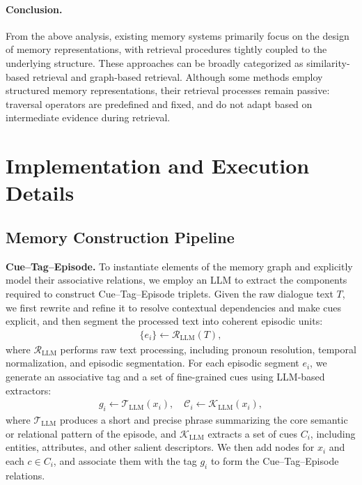 \documentclass{llmxive}
\begin{document}
\paragraph{Conclusion.}
From the above analysis, existing memory systems primarily focus on the design of
memory representations, with retrieval procedures tightly coupled to the
underlying structure.
These approaches can be broadly categorized as similarity-based retrieval and
graph-based retrieval.
Although some methods employ structured memory representations, their retrieval
processes remain passive: traversal operators are predefined and fixed, and do
not adapt based on intermediate evidence during retrieval.



\section{Implementation and Execution Details}
\subsection{Memory Construction Pipeline}
\label{app:memory_system}
\textbf{Cue--Tag--Episode.}
To instantiate elements of the memory graph and explicitly model their associative relations, we employ an LLM to extract the components required to construct Cue--Tag--Episode triplets.
Given the raw dialogue text $T$, we first rewrite and refine it to resolve contextual dependencies and make cues explicit, and then segment the processed text into coherent episodic units:
\begin{align}
\{e_i\} \leftarrow \mathcal{R}_{\text{LLM}}(T),
\end{align}
where $\mathcal{R}_{\text{LLM}}$ performs raw text processing, including pronoun resolution, temporal normalization, and episodic segmentation.
For each episodic segment $e_i$, we generate an associative tag and a set of fine-grained cues using LLM-based extractors:
\begin{align}
g_i \leftarrow \mathcal{T}_{\text{LLM}}(x_i), \quad
\mathcal{C}_i \leftarrow \mathcal{K}_{\text{LLM}}(x_i),
\end{align}
where $\mathcal{T}_{\text{LLM}}$ produces a short and precise phrase summarizing the core semantic or relational pattern of the episode,
and $\mathcal{K}_{\text{LLM}}$ extracts a set of cues $C_i$, including entities, attributes, and other salient descriptors.
We then add nodes for $x_i$ and each $c \in C_i$, and associate them with the tag $g_i$ to form the Cue--Tag--Episode relations.
\end{document}
